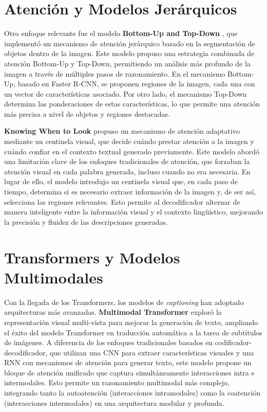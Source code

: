 \section{Atención y Modelos Jerárquicos}

Otro enfoque relevante fue el modelo \textbf{Bottom-Up and Top-Down} \cite{anderson2018bottom}, que implementó un mecanismo de atención jerárquico basado en la segmentación de objetos dentro de la imagen. Este modelo propuso una estrategia combinada de atención Bottom-Up y Top-Down, permitiendo un análisis más profundo de la imagen a través de múltiples pasos de razonamiento. En el mecanismo Bottom-Up, basado en Faster R-CNN, se proponen regiones de la imagen, cada una con un vector de características asociado. Por otro lado, el mecanismo Top-Down determina las ponderaciones de estas características, lo que permite una atención más precisa a nivel de objetos y regiones destacadas.

\textbf{Knowing When to Look} \cite{lu2017knowing} propuso un mecanismo de atención adaptativo mediante un centinela visual, que decide cuándo prestar atención a la imagen y cuándo confiar en el contexto textual generado previamente. Este modelo abordó una limitación clave de los enfoques tradicionales de atención, que forzaban la atención visual en cada palabra generada, incluso cuando no era necesaria. En lugar de ello, el modelo introdujo un centinela visual que, en cada paso de tiempo, determina si es necesario extraer información de la imagen y, de ser así, selecciona las regiones relevantes. Esto permite al decodificador alternar de manera inteligente entre la información visual y el contexto lingüístico, mejorando la precisión y fluidez de las descripciones generadas.

\section{Transformers y Modelos Multimodales}

Con la llegada de los Transformers, los modelos de \textit{captioning} han adoptado arquitecturas más avanzadas. \textbf{Multimodal Transformer} \cite{yu2019multimodal} exploró la representación visual multi-vista para mejorar la generación de texto, ampliando el éxito del modelo Transformer en traducción automática a la tarea de subtítulos de imágenes. A diferencia de los enfoques tradicionales basados en codificador-decodificador, que utilizan una CNN para extraer características visuales y una RNN con mecanismos de atención para generar texto, este modelo propone un bloque de atención unificado que captura simultáneamente interacciones intra e intermodales. Esto permite un razonamiento multimodal más complejo, integrando tanto la autoatención (interacciones intramodales) como la coatención (interacciones intermodales) en una arquitectura modular y profunda.

